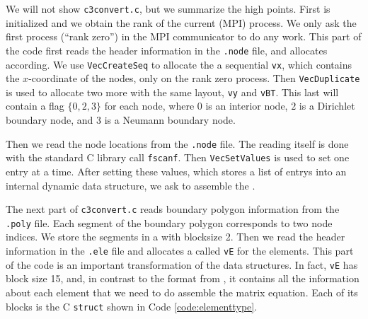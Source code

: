 We will not show \texttt{c3convert.c}, but we summarize the high points.  First \PETSc is initialized and we obtain the rank of the current (MPI) process.  We only ask the first process (``rank zero'') in the MPI communicator to do any work.  This part of the code first reads the header information in the \texttt{.node} file, and allocates \PETSc \pVecs according.  We use \texttt{VecCreateSeq} to allocate the a sequential \pVec \texttt{vx}, which contains the $x$-coordinate of the nodes, only on the rank zero process.  Then \texttt{VecDuplicate} is used to allocate two more \pVecs with the same layout, \texttt{vy} and \texttt{vBT}.  This last \pVec will contain a flag $\{0,2,3\}$ for each node, where $0$ is an interior node, $2$ is a Dirichlet boundary node, and $3$ is a Neumann boundary node.

Then we read the node locations from the \texttt{.node} file.  The reading itself is done with the standard C library call \texttt{fscanf}.  Then \texttt{VecSetValues} is used to set one entry at a time.  After setting these values, which stores a list of entrys into an internal \PETSc dynamic data structure, we ask \PETSc to assemble the \pVecs.

The next part of \texttt{c3convert.c} reads boundary polygon information from the \texttt{.poly} file.  Each segment of the boundary polygon corresponds to two node indices.  We store the segments in a \pVec with blocksize 2.  Then we read the header information in the \texttt{.ele} file and allocates a \pVec called \texttt{vE} for the elements.  This part of the code is an important transformation of the data structures.  In fact, \texttt{vE} has block size 15, and, in contrast to the format from \Triangle, it contains all the information about each element that we need to do assemble the matrix equation.  Each of its blocks is the C \texttt{struct} shown in Code \ref{code:elementtype}.


